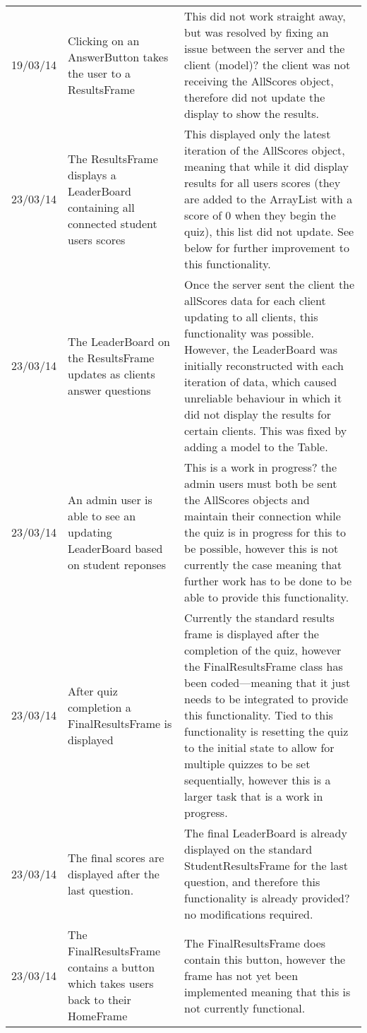 \begin{longtabu}{l X X}
	19/03/14	&Clicking on an AnswerButton takes the user to a ResultsFrame	&This did not work straight away, but was resolved by fixing an issue between the server and the client (model)? the client was not receiving the AllScores object, therefore did not update the display to show the results.\\
	23/03/14	&The ResultsFrame displays a LeaderBoard containing all connected student users scores	&This displayed only the latest iteration of the AllScores object, meaning that while it did display results for all users scores (they are added to the ArrayList with a score of 0 when they begin the quiz), this list did not update. See below for further improvement to this functionality.\\
	23/03/14	&The LeaderBoard on the ResultsFrame updates as clients answer questions	&Once the server sent the client the allScores data for each client updating to all clients, this functionality was possible. However, the LeaderBoard was initially reconstructed with each iteration of data, which caused unreliable behaviour in which it did not display the results for certain clients. This was fixed by adding a model to the Table.\\
	23/03/14	&An admin user is able to see an updating LeaderBoard based on student reponses	&This is a work in progress? the admin users must both be sent the AllScores objects and maintain their connection while the quiz is in progress for this to be possible, however this is not currently the case meaning that further work has to be done to be able to provide this functionality.\\
	23/03/14	&After quiz completion a FinalResultsFrame is displayed	&Currently the standard results frame is displayed after the completion of the quiz, however the FinalResultsFrame class has been coded---meaning that it just needs to be integrated to provide this functionality. Tied to this functionality is resetting the quiz to the initial state to allow for multiple quizzes to be set sequentially, however this is a larger task that is a work in progress.\\
	23/03/14	&The final scores are displayed after the last question.	&The final LeaderBoard is already displayed on the standard StudentResultsFrame for the last question, and therefore this functionality is already provided? no modifications required.\\
	23/03/14	&The FinalResultsFrame contains a button which takes users back to their HomeFrame	&The FinalResultsFrame does contain this button, however the frame has not yet been implemented meaning that this is not currently functional.\\
	\bottomrule
\end{longtabu}
